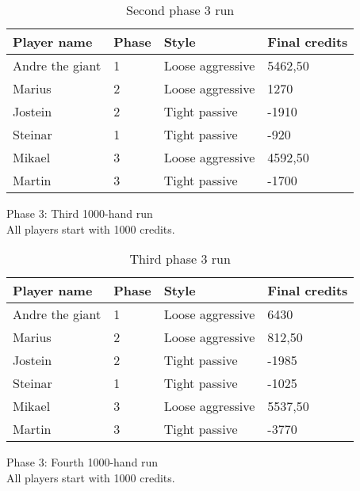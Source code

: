 \documentclass[a4paper, 12pt]{article}
\begin{document}
\begin{table}[H]
	\begin{center}
		\begin{tabular}{|l|l|l| p{6cm} |}
		\hline
		\textbf{Player name} & \textbf{Phase} & \textbf{Style} & \textbf{Final credits} \\
		\hline
		Andre the giant & 1 & Loose aggressive & 5462,50 \\
		\hline
		Marius & 2 & Loose aggressive & 1270 \\
		\hline
		Jostein & 2 & Tight passive & -1910 \\
		\hline
		Steinar & 1 & Tight passive & -920 \\
		\hline
		Mikael & 3 & Loose aggressive & 4592,50 \\
		\hline
		Martin & 3 & Tight passive & -1700 \\
		\hline
		\end{tabular}
	\end{center}
	\caption{Second phase 3 run}
\end{table}

\begin{center}
	{ \Large Phase 3: Third 1000-hand run } \\
	All players start with 1000 credits.
\end{center}

\begin{table}[H]
	\begin{center}
		\begin{tabular}{|l|l|l| p{6cm} |}
		\hline
		\textbf{Player name} & \textbf{Phase} & \textbf{Style} & \textbf{Final credits} \\
		\hline
		Andre the giant & 1 & Loose aggressive & 6430 \\
		\hline
		Marius & 2 & Loose aggressive & 812,50 \\
		\hline
		Jostein & 2 & Tight passive & -1985 \\
		\hline
		Steinar & 1 & Tight passive & -1025 \\
		\hline
		Mikael & 3 & Loose aggressive & 5537,50 \\
		\hline
		Martin & 3 & Tight passive & -3770 \\
		\hline
		\end{tabular}
	\end{center}
	\caption{Third phase 3 run}
\end{table}

\begin{center}
	{ \Large Phase 3: Fourth 1000-hand run } \\
	All players start with 1000 credits.
\end{center}
\end{document}

